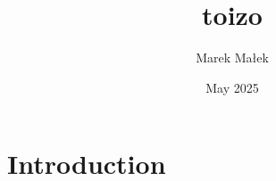 \documentclass{article}
\title{toizo}
\author{Marek Małek}
\date{May 2025}
\begin{document}
\maketitle

\section{Introduction}
\end{document}
